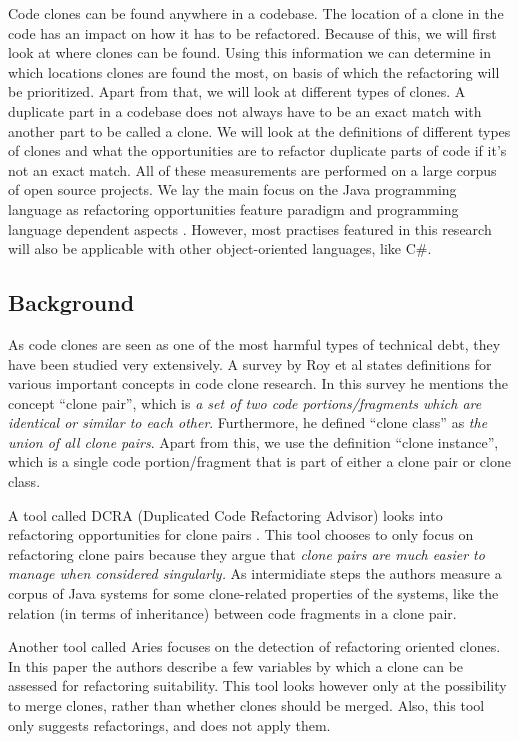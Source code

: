 \documentclass[a4paper]{article}
\begin{document}
Code clones can be found anywhere in a codebase. The location of a clone in the code has an impact on how it has to be refactored. Because of this, we will first look at where clones can be found. Using this information we can determine in which locations clones are found the most, on basis of which the refactoring will be prioritized. Apart from that, we will look at different types of clones. A duplicate part in a codebase does not always have to be an exact match with another part to be called a clone. We will look at the definitions of different types of clones and what the opportunities are to refactor duplicate parts of code if it's not an exact match. All of these measurements are performed on a large corpus of open source projects. We lay the main focus on the Java programming language as refactoring opportunities feature paradigm and programming language dependent aspects \cite{choi2011extracting}. However, most practises featured in this research will also be applicable with other object-oriented languages, like C\#.

\subsection{Background}
As code clones are seen as one of the most harmful types of technical debt, they have been studied very extensively. A survey by Roy et al \cite{roy2007survey} states definitions for various important concepts in code clone research. In this survey he mentions the concept ``clone pair'', which is \textit{a set of two code portions/fragments which are identical or similar to each other}. Furthermore, he defined ``clone class'' as \textit{the union of all clone pairs}. Apart from this, we use the definition ``clone instance'', which is a single code portion/fragment that is part of either a clone pair or clone class.

A tool called DCRA (Duplicated Code Refactoring Advisor) looks into refactoring opportunities for clone pairs \cite{fontana2012duplicated}. This tool chooses to only focus on refactoring clone pairs because they argue that \textit{clone pairs are much easier to manage when considered singularly.} As intermidiate steps the authors measure a corpus of Java systems for some clone-related properties of the systems, like the relation (in terms of inheritance) between code fragments in a clone pair.

Another tool called Aries \cite{higo2004aries, higo2008metric} focuses on the detection of refactoring oriented clones. In this paper the authors describe a few variables by which a clone can be assessed for refactoring suitability. This tool looks however only at the possibility to merge clones, rather than whether clones should be merged. Also, this tool only suggests refactorings, and does not apply them.
\end{document}
